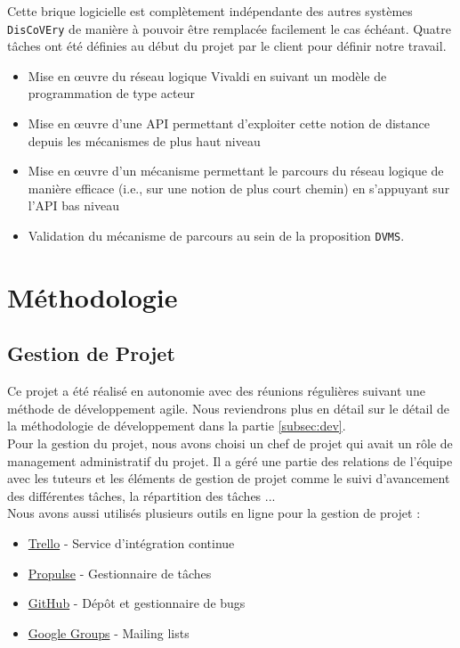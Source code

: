 \documentclass[11pt,a4paper]{article}
\begin{document}
Cette brique logicielle est complètement indépendante des autres systèmes \texttt{DisCoVEry} de manière à pouvoir être remplacée facilement le cas échéant. Quatre tâches ont été définies au début du projet par le client pour définir notre travail.

\begin{itemize}
\item Mise en \oe uvre du réseau logique Vivaldi en suivant un modèle de programmation de type acteur
\item Mise en \oe uvre d'une API permettant d'exploiter cette notion de distance depuis les mécanismes de plus haut niveau
\item Mise en \oe uvre d'un mécanisme permettant le parcours du réseau logique de manière efficace (i.e., sur une notion de plus court chemin) en s'appuyant sur l'API bas niveau
\item Validation du mécanisme de parcours au sein de la proposition \texttt{DVMS}.
\end{itemize}

\section{Méthodologie}
\subsection{Gestion de Projet}
Ce projet a été réalisé en autonomie avec des réunions régulières suivant une méthode de développement agile. Nous reviendrons plus en détail sur le détail de la méthodologie de développement dans la partie \ref{subsec:dev}.\\

Pour la gestion du projet, nous avons choisi un chef de projet qui avait un rôle de management administratif du projet. Il a géré une partie des relations de l'équipe avec les tuteurs et les éléments de gestion de projet comme le suivi d'avancement des différentes tâches, la répartition des tâches ...\\

Nous avons aussi utilisés plusieurs outils en ligne pour la gestion de projet :
\begin{itemize}
\item \href{https://www.trello.com}{Trello} - Service d'intégration continue
\item \href{http://ppulse.fr}{Propulse} - Gestionnaire de tâches
\item \href{http://www.github.com}{GitHub} - Dépôt et gestionnaire de bugs
\item \href{https://groups.google.com}{Google Groups} - Mailing lists\\
\end{itemize}
\end{document}
